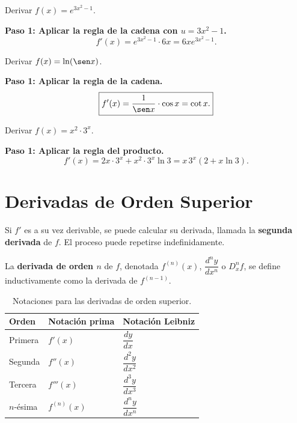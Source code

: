 \begin{example}[Derivada de $e^{3x^2-1}$]
Derivar $f(x) = e^{3x^2-1}$.

\begin{myproof}

\textbf{Paso 1: Aplicar la regla de la cadena con $u=3x^2-1$.}
\[
\boxed{f'(x) = e^{3x^2-1}\cdot 6x = 6xe^{3x^2-1}.}
\]
\end{myproof}
\end{example}

\begin{example}
Derivar $f(x) = \ln(\sen x)$.

\begin{myproof}

\textbf{Paso 1: Aplicar la regla de la cadena.}
\[
\boxed{f'(x) = \dfrac{1}{\sen x}\cdot\cos x = \cot x.}
\]
\end{myproof}
\end{example}

\begin{example}
Derivar $f(x) = x^2\cdot 3^x$.

\begin{myproof}

\textbf{Paso 1: Aplicar la regla del producto.}
\[
\boxed{f'(x) = 2x\cdot 3^x + x^2\cdot 3^x\ln 3 = x\,3^x(2+x\ln 3).}
\]
\end{myproof}
\end{example}

\section{Derivadas de Orden Superior}

Si $f'$ es a su vez derivable, se puede calcular su derivada, llamada la \textbf{segunda derivada} de $f$. El proceso puede repetirse indefinidamente.

\begin{definition}
La \textbf{derivada de orden $n$} de $f$, denotada $f^{(n)}(x)$,
$\dfrac{d^n y}{dx^n}$ o $D^n_x f$, se define inductivamente como la
derivada de $f^{(n-1)}$.
\end{definition}

\begin{table}[H]
\centering
\renewcommand{\arraystretch}{1.4}
\begin{tabular}{l l l}
\toprule
\textbf{Orden} & \textbf{Notación prima} & \textbf{Notación Leibniz} \\
\midrule
Primera & $f'(x)$ & $\dfrac{dy}{dx}$ \\
Segunda & $f''(x)$ & $\dfrac{d^2y}{dx^2}$ \\
Tercera & $f'''(x)$ & $\dfrac{d^3y}{dx^3}$ \\
$n$-ésima & $f^{(n)}(x)$ & $\dfrac{d^ny}{dx^n}$ \\
\bottomrule
\end{tabular}
\caption{Notaciones para las derivadas de orden superior.}
\end{table}

